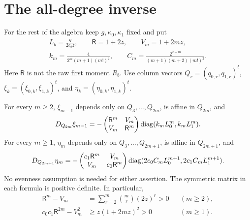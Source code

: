 \section{The all-degree inverse}
\label{sec:inverse}
For the rest of the algebra keep $g,\kappa_0,\kappa_1$ fixed and put
\begin{equation}\label{eq:constants}
\begin{gathered}
 L_b=\frac{g}{2c_bz},\qquad \mathsf R=1+2z,\qquad V_m=1+2mz,\\
 k_m=\frac4{2^m(m+1)(m!)^2},\qquad
 C_m=\frac{2^{2-m}}{(m+1)(m+2)(m!)^2}.
\end{gathered}
\end{equation}
Here $\mathsf R$ is not the raw first moment $R_b$.
Use column vectors $Q_r=(q_{0,r},q_{1,r})^t$,
$\xi_k=(\xi_{0,k},\xi_{1,k})^t$, and
$\eta_k=(\eta_{0,k},\eta_{1,k})^t$.

\begin{proposition}\label{prop:blocks}
For every $m\ge2$, $\xi_{m-1}$ depends only on $Q_3,\ldots,Q_{2m}$,
is affine in $Q_{2m}$, and
\begin{equation}\label{eq:evenblock}
 D_{Q_{2m}}\xi_{m-1}
 =-\begin{pmatrix}\mathsf R^m&V_m\\V_m&\mathsf R^m\end{pmatrix}
                      \operatorname{diag}(k_mL_0^m,k_mL_1^m).
\end{equation}
For every $m\ge1$, $\eta_m$ depends only on $Q_3,\ldots,Q_{2m+1}$,
is affine in $Q_{2m+1}$, and
\begin{equation}\label{eq:oddblock}
 D_{Q_{2m+1}}\eta_m
 =-\begin{pmatrix}c_1\mathsf R^m&V_m\\
                   V_m&c_0\mathsf R^m\end{pmatrix}
              \operatorname{diag}(2c_0C_mL_0^{m+1},2c_1C_mL_1^{m+1}).
\end{equation}
No evenness assumption is needed for either assertion. The symmetric
matrix in each formula is positive definite. In particular,
\begin{align}
 \mathsf R^m-V_m&=\sum_{r=2}^m\binom mr(2z)^r>0
                          &&(m\ge2),\label{eq:evenpositive}\\
 c_0c_1\mathsf R^{2m}-V_m^2
   &\ge z(1+2mz)^2>0 &&(m\ge1).\label{eq:oddpositive}
\end{align}
\end{proposition}

